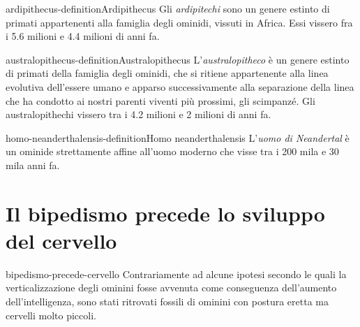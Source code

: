 \documentclass[preview]{standalone}
\begin{document}
\begin{snippetdefinition}{ardipithecus-definition}{Ardipithecus}
    Gli \textit{ardipitechi} sono un genere estinto di primati appartenenti alla famiglia degli ominidi,
    vissuti in Africa.
    Essi vissero fra i 5.6 milioni e 4.4 milioni di anni fa.
\end{snippetdefinition}


\begin{snippetdefinition}{australopithecus-definition}{Australopithecus}
    L'\textit{australopitheco} è un genere estinto di primati della famiglia
    degli ominidi, che si ritiene appartenente alla linea
    evolutiva dell'essere umano e apparso successivamente alla separazione della
    linea che ha condotto ai nostri parenti viventi più prossimi, gli scimpanzé.
    Gli australopithechi vissero tra i 4.2 milioni e 2 milioni di anni fa.
\end{snippetdefinition}

\begin{snippetdefinition}{homo-neanderthalensis-definition}{Homo neanderthalensis}
    L'\textit{uomo di Neandertal} è un ominide strettamente affine all'uomo moderno
    che visse tra i 200 mila e 30 mila anni fa.
\end{snippetdefinition}


\section{Il bipedismo precede lo sviluppo del cervello}

\begin{snippet}{bipedismo-precede-cervello}
    Contrariamente ad alcune ipotesi secondo le quali la verticalizzazione degli
    ominini fosse avvenuta come conseguenza dell'aumento dell'intelligenza,
    sono stati ritrovati fossili di ominini con postura eretta ma cervelli molto piccoli.
\end{snippet}
\end{document}
